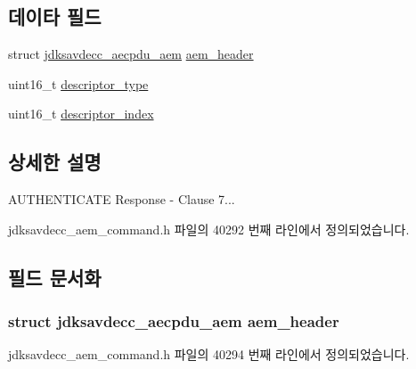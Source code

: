 \subsection*{데이타 필드}
\begin{DoxyCompactItemize}
\item 
struct \hyperlink{structjdksavdecc__aecpdu__aem}{jdksavdecc\+\_\+aecpdu\+\_\+aem} \hyperlink{structjdksavdecc__aem__command__authenticate__response_ae1e77ccb75ff5021ad923221eab38294}{aem\+\_\+header}
\item 
uint16\+\_\+t \hyperlink{structjdksavdecc__aem__command__authenticate__response_ab7c32b6c7131c13d4ea3b7ee2f09b78d}{descriptor\+\_\+type}
\item 
uint16\+\_\+t \hyperlink{structjdksavdecc__aem__command__authenticate__response_a042bbc76d835b82d27c1932431ee38d4}{descriptor\+\_\+index}
\end{DoxyCompactItemize}


\subsection{상세한 설명}
A\+U\+T\+H\+E\+N\+T\+I\+C\+A\+TE Response -\/ Clause 7... 

jdksavdecc\+\_\+aem\+\_\+command.\+h 파일의 40292 번째 라인에서 정의되었습니다.



\subsection{필드 문서화}
\subsubsection[{\texorpdfstring{aem\+\_\+header}{aem_header}}]{\setlength{\rightskip}{0pt plus 5cm}struct {\bf jdksavdecc\+\_\+aecpdu\+\_\+aem} aem\+\_\+header}\hypertarget{structjdksavdecc__aem__command__authenticate__response_ae1e77ccb75ff5021ad923221eab38294}{}\label{structjdksavdecc__aem__command__authenticate__response_ae1e77ccb75ff5021ad923221eab38294}


jdksavdecc\+\_\+aem\+\_\+command.\+h 파일의 40294 번째 라인에서 정의되었습니다.

